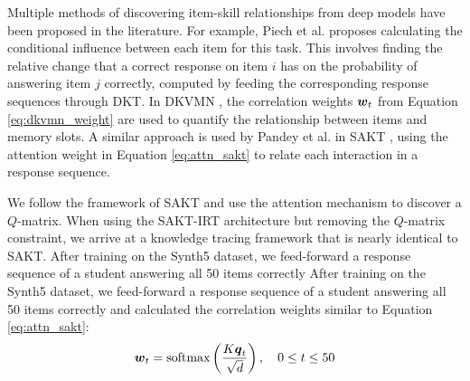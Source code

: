 Multiple methods of discovering item-skill relationships from deep models have been proposed in the literature. For example, Piech et al. \cite{piech2015} proposes calculating the conditional influence between each item for this task. This involves finding the relative change that a correct response on item $i$ has on the probability of answering item $j$ correctly, computed by feeding the corresponding response sequences through DKT. In DKVMN \cite{zhang2017}, the correlation weights $\boldsymbol{w}_t$ from Equation \ref{eq:dkvmn_weight} are used to quantify the relationship between items and memory slots. A similar approach is used by Pandey et al. in SAKT \cite{pandey2019}, using the attention weight in Equation \ref{eq:attn_sakt} to relate each interaction in a response sequence.

We follow the framework of SAKT and use the attention mechanism to discover a $Q$-matrix. When using the SAKT-IRT architecture but removing the $Q$-matrix constraint, we arrive at a knowledge tracing framework that is nearly identical to SAKT. After training on the Synth5 dataset, we feed-forward a response sequence of a student answering all 50 items correctly After training on the Synth5 dataset, we feed-forward a response sequence of a student answering all 50 items correctly and calculated the correlation weights similar to Equation \ref{eq:attn_sakt}:
\begin{equation}
  \boldsymbol{w}_t = \text{softmax}\left(\frac{K \boldsymbol{q}_t}{\sqrt{d}} \right), \quad 0\leq t \leq 50
  \label{eq:q_cor_weights}
\end{equation}

